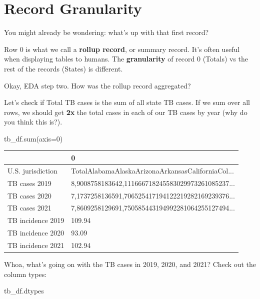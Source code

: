 \documentclass[
  letterpaper,
  DIV=11,
  numbers=noendperiod]{scrreprt}
\newenvironment{Shaded}{\begin{snugshade}}{\end{snugshade}}
\newcommand{\BuiltInTok}[1]{\textcolor[rgb]{0.00,0.23,0.31}{#1}}
\newcommand{\DecValTok}[1]{\textcolor[rgb]{0.68,0.00,0.00}{#1}}
\newcommand{\NormalTok}[1]{\textcolor[rgb]{0.00,0.23,0.31}{#1}}
\newcommand{\OperatorTok}[1]{\textcolor[rgb]{0.37,0.37,0.37}{#1}}
\begin{document}
\hypertarget{record-granularity}{%
\section{Record Granularity}\label{record-granularity}}

You might already be wondering: what's up with that first record?

Row 0 is what we call a \textbf{rollup record}, or summary record. It's
often useful when displaying tables to humans. The \textbf{granularity}
of record 0 (Totals) vs the rest of the records (States) is different.

Okay, EDA step two. How was the rollup record aggregated?

Let's check if Total TB cases is the sum of all state TB cases. If we
sum over all rows, we should get \textbf{2x} the total cases in each of
our TB cases by year (why do you think this is?).

\begin{Shaded}
\begin{Highlighting}[]
\NormalTok{tb\_df.}\BuiltInTok{sum}\NormalTok{(axis}\OperatorTok{=}\DecValTok{0}\NormalTok{)}
\end{Highlighting}
\end{Shaded}

\begin{tabular}{ll}
\toprule
{} &                                                  0 \\
\midrule
U.S. jurisdiction &  TotalAlabamaAlaskaArizonaArkansasCaliforniaCol... \\
TB cases 2019     &  8,9008758183642,111666718245583029973261085237... \\
TB cases 2020     &  7,1737258136591,706525417194122219282169239376... \\
TB cases 2021     &  7,8609258129691,750585443194992281064255127494... \\
TB incidence 2019 &                                             109.94 \\
TB incidence 2020 &                                              93.09 \\
TB incidence 2021 &                                             102.94 \\
\bottomrule
\end{tabular}

Whoa, what's going on with the TB cases in 2019, 2020, and 2021? Check
out the column types:

\begin{Shaded}
\begin{Highlighting}[]
\NormalTok{tb\_df.dtypes}
\end{Highlighting}
\end{Shaded}
\end{document}
